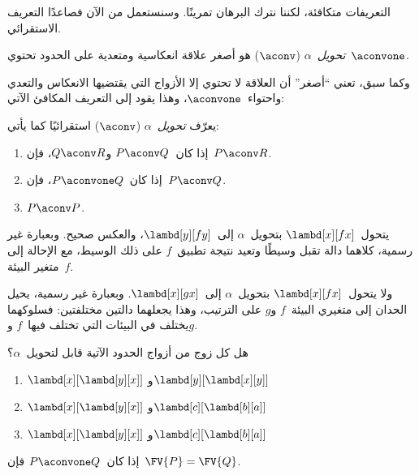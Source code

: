 \documentclass[../../../include/open-logic-section]{subfiles}
\begin{document}
التعريفات متكافئة، لكننا نترك البرهان تمرينًا. وسنستعمل من الآن فصاعدًا
التعريف الاستقرائي.

\begin{defn}
  \emph{تحويل~$\alpha$} ($\aconv$) هو أصغر علاقة انعكاسية ومتعدية على
  الحدود تحتوي~$\aconvone$.
\end{defn}

وكما سبق، تعني ``أصغر'' أن العلاقة لا تحتوي إلا الأزواج التي يقتضيها
الانعكاس والتعدي واحتواء~$\aconvone$، وهذا يقود إلى التعريف المكافئ الآتي:

\begin{defn} 
  يعرّف \emph{تحويل~$\alpha$} ($\aconv$) استقرائيًا كما يأتي:
  \begin{enumerate}
  \item إذا كان~$P \aconv Q$ و$Q \aconv R$، فإن~$P \aconv R$.
  \item إذا كان~$P \aconvone Q$، فإن~$P \aconv Q$. 
  \item $P \aconv P$. 
  \end{enumerate}
\end{defn}

\begin{ex}
  يتحول~$\lambd[x][f x]$ بتحويل~$\alpha$ إلى~$\lambd[y][f
  y]$، والعكس صحيح. وبعبارة غير رسمية، كلاهما دالة تقبل وسيطًا وتعيد
  نتيجة تطبيق~$f$ على ذلك الوسيط، مع الإحالة إلى متغير البيئة~$f$.

  ولا يتحول~$\lambd[x][f x]$ بتحويل~$\alpha$ إلى~$\lambd[x][g
    x]$. وبعبارة غير رسمية، يحيل الحدان إلى متغيري البيئة~$f$ و$g$ على
  الترتيب، وهذا يجعلهما دالتين مختلفتين: فسلوكهما يختلف في البيئات التي
  تختلف فيها~$f$ و$g$.
\end{ex}

\begin{prob}
  هل كل زوج من أزواج الحدود الآتية قابل لتحويل~$\alpha$؟
  \begin{enumerate}
  \item $\lambd[x][\lambd[y][x]]$ و$\lambd[y][\lambd[x][y]]$
  \item $\lambd[x][\lambd[y][x]]$ و$\lambd[c][\lambd[b][a]]$
  \item $\lambd[x][\lambd[y][x]]$ و$\lambd[c][\lambd[b][a]]$
  \end{enumerate}
\end{prob}

\begin{lem}
  إذا كان~$P \aconvone Q$ فإن~$\FV{P} = \FV{Q}$.
\end{lem}
\end{document}
